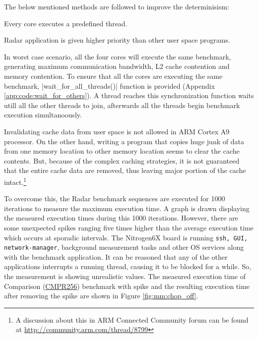 \noindent
The below mentioned methods are followed to improve the determinisism:
\begin{compactitem} 
	\item Every core executes a predefined thread.
	\item Radar application is given higher priority than other user space programs. \\
\end{compactitem} 

In worst case scenario, all the four cores will execute the same benchmark, generating maximum communication bandwidth, L2 cache contention and memory contention. To ensure that all the cores are executing the same benchmark, \bverb|wait_for_all_threads()| function is provided (Appendix \ref{app:code:wait_for_others}). A thread reaches this synchronization function waits utill all the other threads to join, afterwards all the threads begin benchmark execution simultanoously.

Invalidating cache data from user space is not allowed in ARM Cortex A9 processor. On the other hand, writing a program that copies huge junk of data from one memory location to other memory location seems to clear the cache contents. But, because of the complex caching strategies, it is not guaranteed that the entire cache data are removed, thus leaving major portion of the cache intact.\footnote{A discussion about this in ARM Connected Community forum can be found at \url{http://community.arm.com/thread/8799}} 

To overcome this, the Radar benchmark sequences are executed for 1000 iterations to measure the maximum execution time. A graph is drawn displaying the measured execution times during this 1000 iterations. However, there are some unexpected spikes ranging five times higher than the average execution time which occurs at sporadic intervals. The Nitrogen6X board is running \verb|ssh, GUI,| \\ \verb|network-manager|, background measurement tasks and other OS services along with the benchmark application. It can be reasoned that any of the other applications interrupts a running thread, causing it to be blocked for a while. So, the measurement is showing unrealistic values. The measured execution time of Comparison (\hyperlink{benchmarks}{CMPR256}) benchmark with spike and the resulting execution time after removing the spike are shown in Figure \ref{fig:mm:chop_off}.

